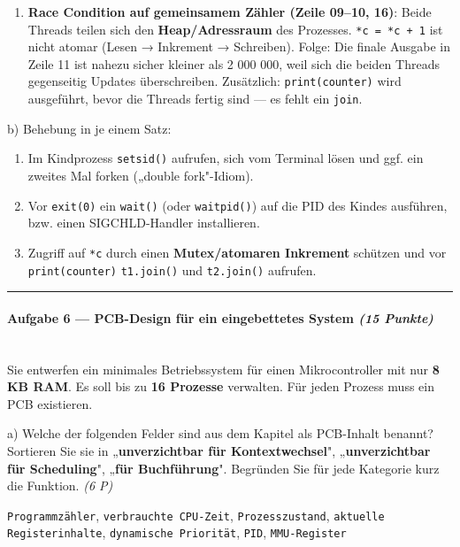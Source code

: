 \documentclass[11pt, a4paper]{article}
\begin{document}
\begin{enumerate}
  \item \textbf{Race Condition auf gemeinsamem Zähler (Zeile 09–10, 16)}: Beide Threads teilen sich den \textbf{Heap/Adressraum} des Prozesses. \texttt{*c = *c + 1} ist nicht atomar (Lesen → Inkrement → Schreiben). Folge: Die finale Ausgabe in Zeile 11 ist nahezu sicher kleiner als 2 000 000, weil sich die beiden Threads gegenseitig Updates überschreiben. Zusätzlich: \texttt{print(counter)} wird ausgeführt, bevor die Threads fertig sind — es fehlt ein \texttt{join}.
\end{enumerate}

b) Behebung in je einem Satz:

\begin{enumerate}
  \item Im Kindprozess \texttt{setsid()} aufrufen, sich vom Terminal lösen und ggf. ein zweites Mal forken („double fork"-Idiom).
  \item Vor \texttt{exit(0)} ein \texttt{wait()} (oder \texttt{waitpid()}) auf die PID des Kindes ausführen, bzw. einen SIGCHLD-Handler installieren.
  \item Zugriff auf \texttt{*c} durch einen \textbf{Mutex/atomaren Inkrement} schützen und vor \texttt{print(counter)} \texttt{t1.join()} und \texttt{t2.join()} aufrufen.
\end{enumerate}


\noindent\textcolor{rulegray}{\rule{\linewidth}{0.4pt}}


\paragraph{Aufgabe 6 — PCB-Design für ein eingebettetes System \textit{(15 Punkte)}}\mbox{}\\[2pt]

Sie entwerfen ein minimales Betriebssystem für einen Mikrocontroller mit nur \textbf{8 KB RAM}. Es soll bis zu \textbf{16 Prozesse} verwalten. Für jeden Prozess muss ein PCB existieren.


a) Welche der folgenden Felder sind aus dem Kapitel als PCB-Inhalt benannt? Sortieren Sie sie in „\textbf{unverzichtbar für Kontextwechsel}", „\textbf{unverzichtbar für Scheduling}", „\textbf{für Buchführung}". Begründen Sie für jede Kategorie kurz die Funktion. \textit{(6 P)}


\texttt{Programmzähler}, \texttt{verbrauchte CPU-Zeit}, \texttt{Prozesszustand}, \texttt{aktuelle Registerinhalte}, \texttt{dynamische Priorität}, \texttt{PID}, \texttt{MMU-Register}
\end{document}
